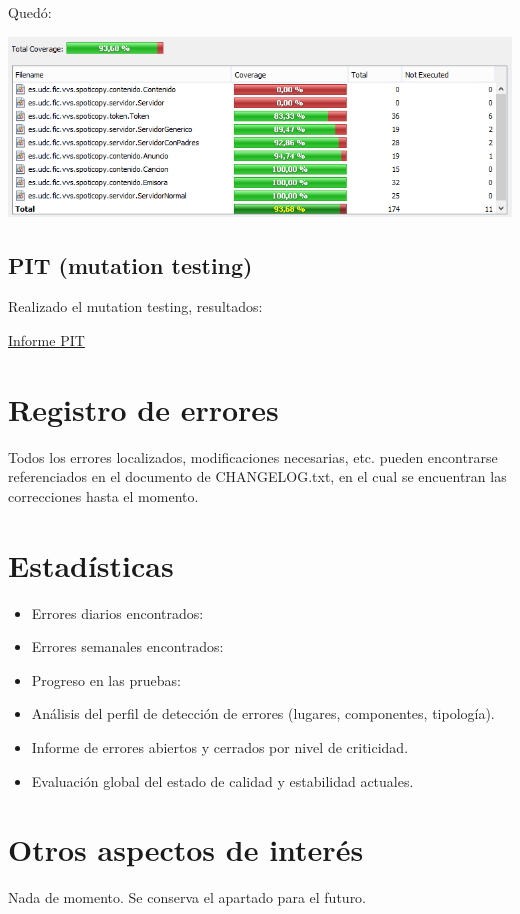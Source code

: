 \documentclass[12pt, a4paper, titlepage]{article}
\begin{document}
Quedó:

\includegraphics[width=15cm]{Imagenes/CoberturaSemana2.png} \\

\subsection{PIT (mutation testing)}

Realizado el mutation testing, resultados:

\href{Informes/PIT1/index.html}{Informe PIT} \\

\section{Registro de errores}

Todos los errores localizados, modificaciones necesarias, etc. pueden encontrarse referenciados en el documento de CHANGELOG.txt, en el cual se encuentran las correcciones hasta el momento.


\section{Estadísticas}

\begin{itemize}
	\item Errores diarios encontrados:
	\item Errores semanales encontrados:
	\item Progreso en las pruebas:
	\item Análisis del perfil de detección de errores (lugares, componentes, tipología).
	\item Informe de errores abiertos y cerrados por nivel de criticidad.
	\item Evaluación global del estado de calidad y estabilidad actuales.
\end{itemize}

\section{Otros aspectos de interés}

Nada de momento. Se conserva el apartado para el futuro.
\end{document}
